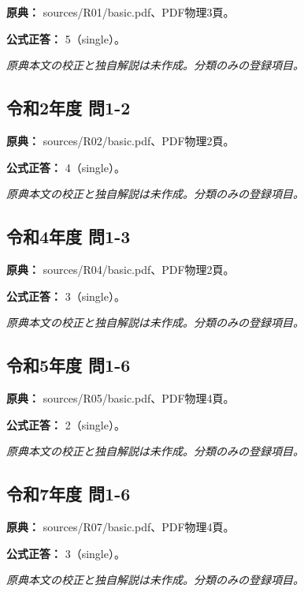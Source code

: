 \noindent\textbf{原典：} sources/R01/basic.pdf、PDF物理3頁。

\textbf{公式正答：} 5（single）。

\par\textit{原典本文の校正と独自解説は未作成。分類のみの登録項目。}

\subsection{令和2年度 問1-2}
\label{q:r02-reg-basic-1-2}

\noindent\textbf{原典：} sources/R02/basic.pdf、PDF物理2頁。

\textbf{公式正答：} 4（single）。

\par\textit{原典本文の校正と独自解説は未作成。分類のみの登録項目。}

\subsection{令和4年度 問1-3}
\label{q:r04-reg-basic-1-3}

\noindent\textbf{原典：} sources/R04/basic.pdf、PDF物理2頁。

\textbf{公式正答：} 3（single）。

\par\textit{原典本文の校正と独自解説は未作成。分類のみの登録項目。}

\subsection{令和5年度 問1-6}
\label{q:r05-reg-basic-1-6}

\noindent\textbf{原典：} sources/R05/basic.pdf、PDF物理4頁。

\textbf{公式正答：} 2（single）。

\par\textit{原典本文の校正と独自解説は未作成。分類のみの登録項目。}

\subsection{令和7年度 問1-6}
\label{q:r07-reg-basic-1-6}

\noindent\textbf{原典：} sources/R07/basic.pdf、PDF物理4頁。

\textbf{公式正答：} 3（single）。

\par\textit{原典本文の校正と独自解説は未作成。分類のみの登録項目。}

